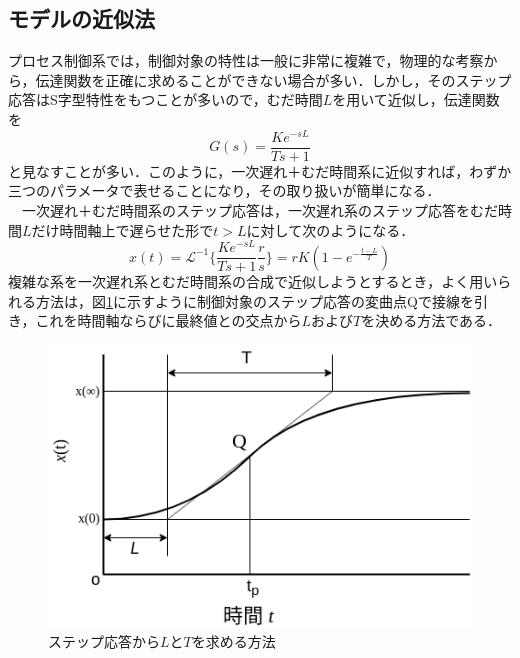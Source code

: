 \documentclass[12pt]{jsarticle}
\begin{document}
\subsection{モデルの近似法}
プロセス制御系では，制御対象の特性は一般に非常に複雑で，物理的な考察から，伝達関数を正確に求めることができない場合が多い．しかし，そのステップ応答はS字型特性をもつことが多いので，むだ時間$L$を用いて近似し，伝達関数を
\begin{equation}
  \label{}
  G(s) = \frac{Ke^{-sL}}{Ts+1}
\end{equation}
と見なすことが多い．このように，一次遅れ＋むだ時間系に近似すれば，わずか三つのパラメータで表せることになり，その取り扱いが簡単になる．\\
　一次遅れ＋むだ時間系のステップ応答は，一次遅れ系のステップ応答をむだ時間$L$だけ時間軸上で遅らせた形で$t>L$に対して次のようになる．
\begin{equation}
  \label{}
  x(t) = \mathcal{L}^{-1}\{\frac{Ke^{-sL}}{Ts+1}\frac{r}{s}\} = rK(1 - e^{-\frac{t-L}{T}})
\end{equation}
複雑な系を一次遅れ系とむだ時間系の合成で近似しようとするとき，よく用いられる方法は，図\ref{LT_fromStepResponse}に示すように制御対象のステップ応答の変曲点Qで接線を引き，これを時間軸ならびに最終値との交点から$L$および$T$を決める方法である．
\begin{figure}[tb]
  \begin{center}
    \includegraphics{../img/2-A2.png}
    \caption{ステップ応答から$L$と$T$を求める方法}
    \label{LT_fromStepResponse}
  \end{center}
\end{figure}
\end{document}
